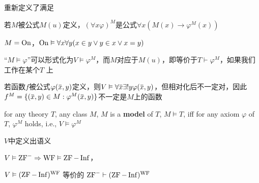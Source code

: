 \documentclass[11pt]{article}
\begin{document}
重新定义了满足

若\(M\)被公式\(M(u)\)定义，\((\forall x\varphi)^{M}\)是公式\(\forall x(M(x)\to\varphi^{M}(x))\)

\begin{examplle}[]
\(M=\operatorname{On}\)，\(\operatorname{On}\vDash\forall x\forall y(x\in y\vee y\in x\vee x= y)\)
\end{examplle}

``\(M\vDash\varphi\)''可以形式化为\(V\vDash\varphi^M\)，而\(M\)对应于\(M(u)\)，即等价于\(T\vdash\varphi^M\)，如果我们工作在某个\(T\)
上

若函数\(f\)被公式\(\varphi(\barx,y)\)定义，则\(V\vDash\forall\barx\exists!y\varphi(\barx,y)\)，但相对化后不一定对，因此
\(f^M=\{(\barx,y)\in M:\varphi^M(\barx,y)\}\)不一定是\(M\)上的函数

\begin{definition}[]
for any theory \(T\), any class \(M\), \(M\) is a \textbf{model} of \(T\), \(M\vDash T\), iff for any axiom
\(\varphi\) of \(T\), \(\varphi^M\) holds, i.e., \(V\vDash\varphi^M\)
\end{definition}

\(V\)中定义出语义

\begin{theorem}[]
\(V\vDash\text{ZF}^-\Rightarrow\operatorname{WF}\vDash\operatorname{ZF}-\operatorname{Inf}\)，

\(V\vDash(\operatorname{ZF}-\operatorname{Inf})^{\operatorname{WF}}\)
等价的
\(\text{ZF}^-\vdash(\operatorname{ZF}-\operatorname{Inf})^{\operatorname{WF}}\)
\end{theorem}
\end{document}
